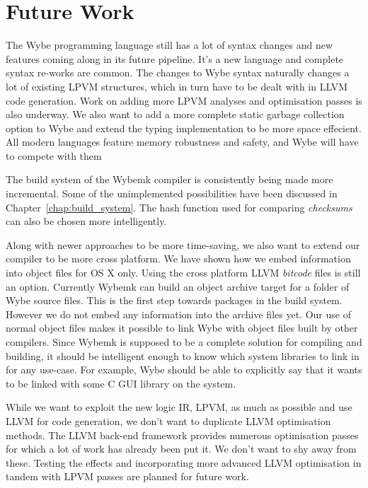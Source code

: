 \chapter{Future Work}
\label{chap:future_work}

The Wybe programming language still has a lot of syntax changes and new
features coming along in its future pipeline. It's a new language and complete
syntax re-works are common. The changes to Wybe syntax naturally changes a lot
of existing LPVM structures, which in turn have to be dealt with in LLVM code
generation. Work on adding more LPVM analyses and optimisation passes is also
underway. We also want to add a more complete static garbage collection option
to Wybe and extend the typing implementation to be more space effecient. All
modern languages feature memory robustness and safety, and Wybe will have to
compete with them

The build system of the Wybemk compiler is consistently being made more
incremental. Some of the unimplemented possibilities have been discussed in
Chapter~\ref{chap:build_system}. The hash function used for comparing
\textit{checksums} can also be chosen more intelligently.

Along with newer approaches to be more time-saving, we also want to extend our
compiler to be more cross platform. We have shown how we embed information into
\macho object files for OS X only. Using the cross platform LLVM
\textit{bitcode} files is still an option. Currently Wybemk can build an object
archive target for a folder of Wybe source files. This is the first step
towards packages in the build system. However we do not embed any information
into the archive files yet. Our use of normal object files makes it possible to
link Wybe with object files built by other compilers. Since Wybemk is supposed
to be a complete solution for compiling and building, it should be intelligent
enough to know which system libraries to link in for any use-case. For example,
Wybe should be able to explicitly say that it wants to be linked with some C
GUI library on the system.

While we want to exploit the new logic IR, LPVM, as much as possible and use
LLVM for code generation, we don't want to duplicate LLVM optimisation
methods. The LLVM back-end framework provides numerous optimisation passes for
which a lot of work has already been put it.  We don't want to shy away from
these. Testing the effects and incorporating more advanced LLVM optimisation in
tandem with LPVM passes are planned for future work.


